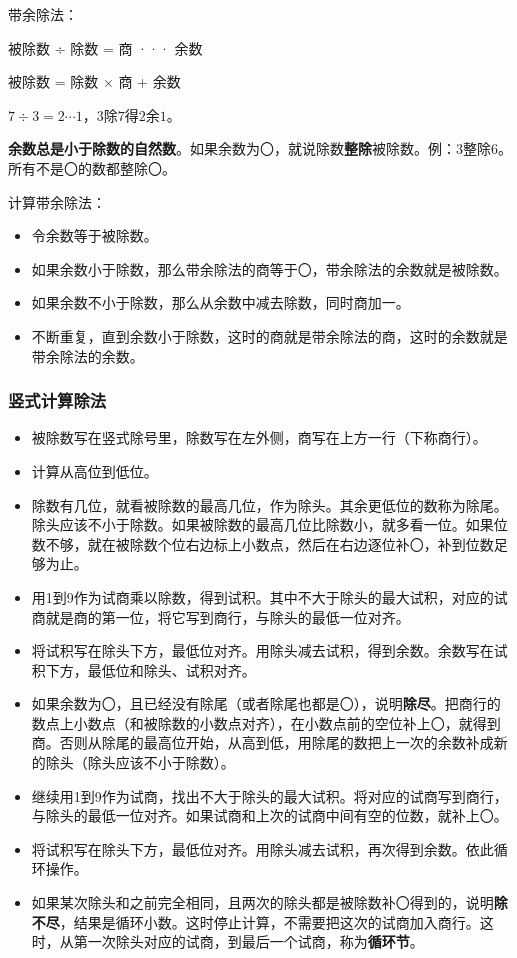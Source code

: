 \documentclass[12pt,UTF8]{ctexart}
\begin{document}
带余除法：

被除数 ÷ 除数 = 商 ··· 余数

被除数 = 除数 × 商 + 余数

\( 7 \div 3 = 2 \cdots 1 \)，\( 3 \)除\( 7 \)得\( 2 \)余\( 1 \)。

\textbf{余数总是小于除数的自然数}。如果余数为〇，就说除数\textbf{整除}被除数。例：\( 3 \)整除\( 6 \)。所有不是〇的数都整除〇。

计算带余除法：
\begin{itemize}
\item 令余数等于被除数。
\item 如果余数小于除数，那么带余除法的商等于〇，带余除法的余数就是被除数。
\item 如果余数不小于除数，那么从余数中减去除数，同时商加一。
\item 不断重复，直到余数小于除数，这时的商就是带余除法的商，这时的余数就是带余除法的余数。
\end{itemize}

\subsubsection{竖式计算除法}

\begin{itemize}
\item 被除数写在竖式除号里，除数写在左外侧，商写在上方一行（下称商行）。
\item 计算从高位到低位。
\item 除数有几位，就看被除数的最高几位，作为除头。其余更低位的数称为除尾。除头应该不小于除数。如果被除数的最高几位比除数小，就多看一位。如果位数不够，就在被除数个位右边标上小数点，然后在右边逐位补〇，补到位数足够为止。
\item 用1到9作为试商乘以除数，得到试积。其中不大于除头的最大试积，对应的试商就是商的第一位，将它写到商行，与除头的最低一位对齐。
\item 将试积写在除头下方，最低位对齐。用除头减去试积，得到余数。余数写在试积下方，最低位和除头、试积对齐。
\item 如果余数为〇，且已经没有除尾（或者除尾也都是〇），说明\textbf{除尽}。把商行的数点上小数点（和被除数的小数点对齐），在小数点前的空位补上〇，就得到商。否则从除尾的最高位开始，从高到低，用除尾的数把上一次的余数补成新的除头（除头应该不小于除数）。
\item 继续用1到9作为试商，找出不大于除头的最大试积。将对应的试商写到商行，与除头的最低一位对齐。如果试商和上次的试商中间有空的位数，就补上〇。
\item 将试积写在除头下方，最低位对齐。用除头减去试积，再次得到余数。依此循环操作。
\item 如果某次除头和之前完全相同，且两次的除头都是被除数补〇得到的，说明\textbf{除不尽}，结果是循环小数。这时停止计算，不需要把这次的试商加入商行。这时，从第一次除头对应的试商，到最后一个试商，称为\textbf{循环节}。
\end{itemize}
\end{document}
